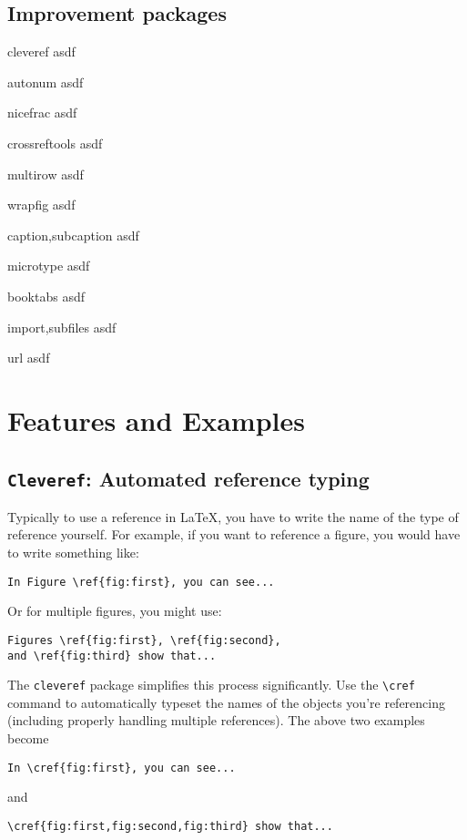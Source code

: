 \documentclass{article}
\begin{document}
\subsection{Improvement packages}
\bdesc
\item[cleveref] asdf
\item[autonum] asdf
\item[nicefrac] asdf
\item[crossreftools] asdf
\item[multirow] asdf
\item[wrapfig] asdf
\item[caption,subcaption] asdf
\item[microtype] asdf
\item[booktabs] asdf
\item[import,subfiles] asdf
\item[url] asdf
\edesc

\section{Features and Examples}

\subsection{\texttt{Cleveref}: Automated reference typing}
Typically to use a reference in \LaTeX, you have to write the name of the type of reference
yourself. For example, if you want to reference a figure, you would have to write something like:
\begin{verbatim}
In Figure \ref{fig:first}, you can see...
\end{verbatim}
Or for multiple figures, you might use:
\begin{verbatim}
Figures \ref{fig:first}, \ref{fig:second}, 
and \ref{fig:third} show that...
\end{verbatim}

The \texttt{cleveref} package simplifies this process significantly. Use the \verb!\cref! command to automatically
typeset the names of the objects you're referencing (including properly handling multiple references). The 
above two examples become
\begin{verbatim}
In \cref{fig:first}, you can see...
\end{verbatim}
and
\begin{verbatim}
\cref{fig:first,fig:second,fig:third} show that...
\end{verbatim}
\end{document}
